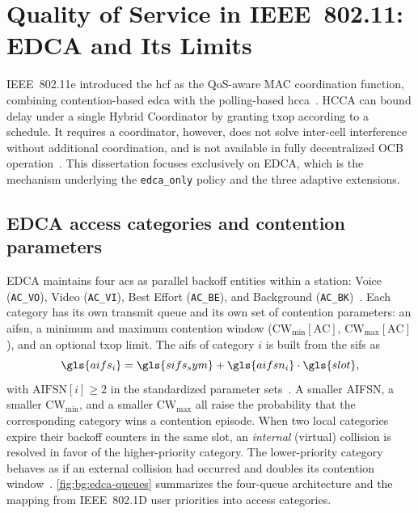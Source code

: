 \section{Quality of Service in IEEE~802.11: EDCA and Its Limits}
\label{sec:bg:edca}

IEEE~802.11e introduced the \gls{hcf} as the QoS-aware MAC coordination function, combining contention-based \gls{edca} with the polling-based \gls{hcca}~\cite{IEEE80211e_2005,mangold2003QoS,IEEE80211}.
HCCA can bound delay under a single Hybrid Coordinator by granting \gls{txop} according to a schedule.
It requires a coordinator, however, does not solve inter-cell interference without additional coordination, and is not available in fully decentralized OCB operation~\cite{mangold2003QoS,kosekszott2012What}.
This dissertation focuses exclusively on EDCA, which is the mechanism underlying the \texttt{edca\_only} policy and the three adaptive extensions.

\subsection{EDCA access categories and contention parameters}
\label{sec:bg:edca-mech}

EDCA maintains four \glspl{ac} as parallel backoff entities within a station: Voice (\texttt{AC\_VO}), Video (\texttt{AC\_VI}), Best Effort (\texttt{AC\_BE}), and Background (\texttt{AC\_BK})~\cite{IEEE80211e_2005,mangold2003QoS,kong2004EDCA}.
Each category has its own transmit queue and its own set of contention parameters: an \gls{aifsn}, a minimum and maximum contention window ($\mathrm{CW}_{\min}[\mathrm{AC}]$, $\mathrm{CW}_{\max}[\mathrm{AC}]$), and an optional \gls{txop} limit.
The \gls{aifs} of category $i$ is built from the \gls{sifs} as
\begin{equation}
  \gls{aifs_i} = \gls{sifs_sym} + \gls{aifsn_i}\cdot \gls{slot},
\end{equation}
with $\mathrm{AIFSN}[i] \ge 2$ in the standardized parameter sets~\cite{mangold2003QoS,RFC8325_WiFi_QoS}.
A smaller AIFSN, a smaller $\mathrm{CW}_{\min}$, and a smaller $\mathrm{CW}_{\max}$ all raise the probability that the corresponding category wins a contention episode.
When two local categories expire their backoff counters in the same slot, an \emph{internal} (virtual) collision is resolved in favor of the higher-priority category.
The lower-priority category behaves as if an external collision had occurred and doubles its contention window~\cite{kong2004EDCA,mangold2003QoS}.
\autoref{fig:bg:edca-queues} summarizes the four-queue architecture and the mapping from IEEE~802.1D user priorities into access categories.

